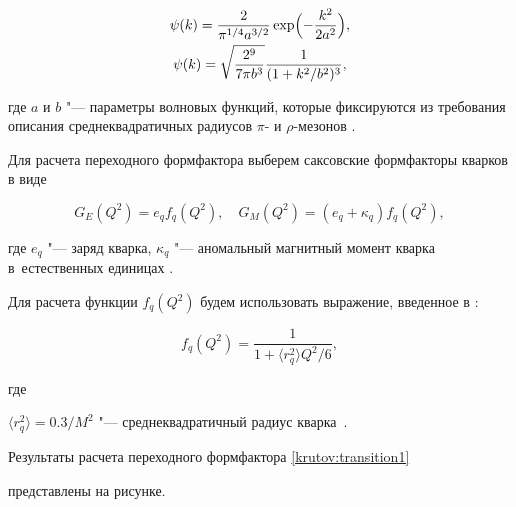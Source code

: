 \begin{gather}\label{krutov:volna1}

\psi(k)=\frac{2}{\pi^{1/4}a^{3/2}}\exp\Bigl(-\frac{k^2}{2a^2}\Bigr),

\\

\label{krutov:stepen}

\psi(k)=\sqrt{\frac{2^9}{7\pi b^{3}}}\frac{1}{(1 + k^2/b^2)^3},

\end{gather}

где $a$ и $b$ "--- параметры волновых функций, которые фиксируются из требования описания среднеквадратичных радиусов $\pi$- и $\rho$-мезонов \cite{KrTr03}.



Для расчета переходного формфактора выберем саксовские формфакторы кварков в виде

\begin{equation}\label{krutov:mmm}

G_{E}(Q^2)=e_{q}f_{q}(Q^2),\quad G_{M}(Q^2)=(e_{q}+\kappa_{q})f_{q}(Q^2),

\end{equation}

где $e_{q}$ "--- заряд кварка, $\kappa_{q}$ "--- аномальный магнитный момент кварка в~естественных единицах \cite{G95}. 

Для расчета функции $f_{q}(Q^2)$ будем использовать выражение, введенное в \cite{CaGNS94}:

\begin{equation}\label{krutov:f2}

f_{q}(Q^2)=\frac{1}{1+\langle r^2_{q}\rangle Q^2/6},

\end{equation}

где

$\langle r^2_{q}\rangle=0.3/M^2$ "--- среднеквадратичный радиус кварка~\cite{CaGNS94}.



Результаты расчета переходного формфактора \eqref{krutov:transition1}

представлены на рисунке.

